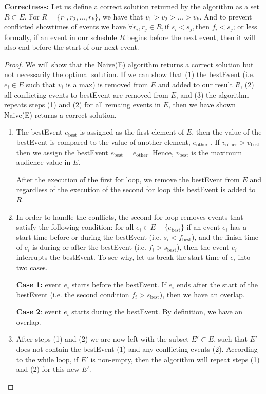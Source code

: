 \documentclass[11pt, oneside]{article}   	%
\theoremstyle{definition}
\theoremstyle{remark}
\begin{document}
\textbf{Correctness:} Let us define a correct solution returned by the algorithm as a set $R \subset E$. For $R=\{r_1, r_2, \ldots, r_k\}$, we have that $v_1 > v_2 > \ldots > v_k$. And to prevent conflicted showtimes of events we have $ \forall r_i, r_j \in R, \text{if } s_i < s_j, \text{then } f_i < s_j$; or less formally, if an event in our schedule $R$ begins before the next event, then it will also end before the start of our next event.
\begin{proof}
We will show that the Naive(E) algorithm returns a correct solution but not necessarily the optimal solution. If we can show that (1) the bestEvent (i.e. $e_i\in E$ such that $v_i$ is a max) is removed from $E$ and added to our result $R$, (2) all conflicting events to bestEvent are removed from $E$, and (3) the algorithm repeats steps (1) and (2) for all remaing events in $E$, then we have shown Naive(E) returns a correct solution. 
	\begin{enumerate}
		\item The bestEvent $e_\text{best}$ is assigned as the first element of $E$, then the value of the bestEvent is compared to the value of another element, $e_\text{other}$ . If $v_\text{other} > v_\text{best}$ then we assign the bestEvent $e_\text{best} = e_\text{other}$. Hence, $v_\text{best}$ is the maximum audience value in $E$.
		
		After the execution of the first for loop, we remove the bestEvent from $E$ and regardless of the execution of the second for loop this bestEvent is added to $R$.
		
		\item In order to handle the conflicts, the second for loop removes events that satisfy the following condition: for all $ e_i \in E - \{e_\text{best}\}$ if an event $e_i$ has a start time before or during the bestEvent (i.e. $s_i < f_\text{best}$), and the finish time of $e_i$ is during or after the bestEvent (i.e. $f_i > s_\text{best}$), then the event $e_i$ interrupts the bestEvent. To see why, let us break the start time of $e_i$ into two cases.
		
			\textbf{Case 1:} event $e_i$ starts before the bestEvent. If $e_i$ ends after the start of the bestEvent (i.e. the second condition $f_i > s_\text{best}$), then we have an overlap.
		
			\textbf{Case 2}: event $e_i$ starts during the bestEvent. By definition, we have an overlap.
		
		\item After steps (1) and (2) we are now left with the subset $E' \subset E$, such that $E'$ does not contain the bestEvent (1) and any conflicting events (2). According to the while loop, if $E'$ is non-empty, then the algorithm will repeat steps (1) and (2) for this new $E'$.
	\end{enumerate}
\end{proof}
\end{document}
